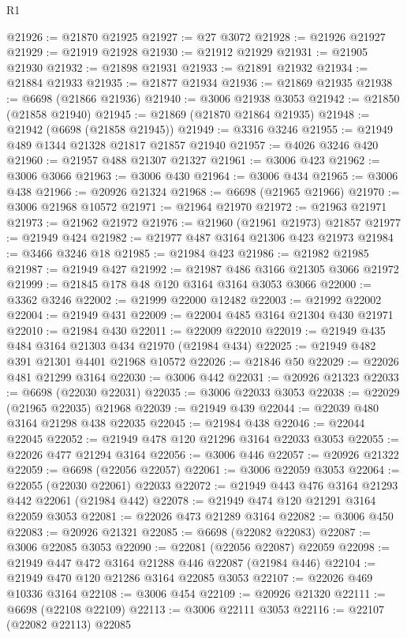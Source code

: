 \begin{lexlean}{R1}
\begin{coremodule}
@21926 := @21870 @21925
@21927 := @27 @3072
@21928 := @21926 @21927
@21929 := @21919 @21928
@21930 := @21912 @21929
@21931 := @21905 @21930
@21932 := @21898 @21931
@21933 := @21891 @21932
@21934 := @21884 @21933
@21935 := @21877 @21934
@21936 := @21869 @21935
@21938 := @6698 (@21866 @21936)
@21940 := @3006 @21938 @3053
@21942 := @21850 (@21858 @21940)
@21945 := @21869 (@21870 @21864 @21935)
@21948 := @21942 (@6698 (@21858 @21945))
@21949 := @3316 @3246
@21955 := @21949 @489 @1344 @21328 @21817 @21857 @21940
@21957 := @4026 @3246 @420
@21960 := @21957 @488 @21307 @21327
@21961 := @3006 @423
@21962 := @3006 @3066
@21963 := @3006 @430
@21964 := @3006 @434
@21965 := @3006 @438
@21966 := @20926 @21324
@21968 := @6698 (@21965 @21966)
@21970 := @3006 @21968 @10572
@21971 := @21964 @21970
@21972 := @21963 @21971
@21973 := @21962 @21972
@21976 := @21960 (@21961 @21973) @21857
@21977 := @21949 @424
@21982 := @21977 @487 @3164 @21306 @423 @21973
@21984 := @3466 @3246 @18
@21985 := @21984 @423
@21986 := @21982 @21985
@21987 := @21949 @427
@21992 := @21987 @486 @3166 @21305 @3066 @21972
@21999 := @21845 @178 @48 @120 @3164 @3164 @3053 @3066
@22000 := @3362 @3246
@22002 := @21999 @22000 @12482
@22003 := @21992 @22002
@22004 := @21949 @431
@22009 := @22004 @485 @3164 @21304 @430 @21971
@22010 := @21984 @430
@22011 := @22009 @22010
@22019 := @21949 @435 @484 @3164 @21303 @434 @21970 (@21984 @434)
@22025 := @21949 @482 @391 @21301 @4401 @21968 @10572
@22026 := @21846 @50
@22029 := @22026 @481 @21299 @3164
@22030 := @3006 @442
@22031 := @20926 @21323
@22033 := @6698 (@22030 @22031)
@22035 := @3006 @22033 @3053
@22038 := @22029 (@21965 @22035) @21968
@22039 := @21949 @439
@22044 := @22039 @480 @3164 @21298 @438 @22035
@22045 := @21984 @438
@22046 := @22044 @22045
@22052 := @21949 @478 @120 @21296 @3164 @22033 @3053
@22055 := @22026 @477 @21294 @3164
@22056 := @3006 @446
@22057 := @20926 @21322
@22059 := @6698 (@22056 @22057)
@22061 := @3006 @22059 @3053
@22064 := @22055 (@22030 @22061) @22033
@22072 := @21949 @443 @476 @3164 @21293 @442 @22061 (@21984 @442)
@22078 := @21949 @474 @120 @21291 @3164 @22059 @3053
@22081 := @22026 @473 @21289 @3164
@22082 := @3006 @450
@22083 := @20926 @21321
@22085 := @6698 (@22082 @22083)
@22087 := @3006 @22085 @3053
@22090 := @22081 (@22056 @22087) @22059
@22098 := @21949 @447 @472 @3164 @21288 @446 @22087 (@21984 @446)
@22104 := @21949 @470 @120 @21286 @3164 @22085 @3053
@22107 := @22026 @469 @10336 @3164
@22108 := @3006 @454
@22109 := @20926 @21320
@22111 := @6698 (@22108 @22109)
@22113 := @3006 @22111 @3053
@22116 := @22107 (@22082 @22113) @22085

\end{coremodule}
\end{lexlean}

